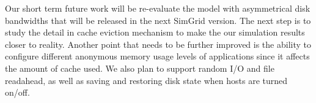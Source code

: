 \documentclass[conference]{IEEEtran}
\begin{document}
			Our short term future work will be re-evaluate the model with asymmetrical 
			disk bandwidths that will be released in the next SimGrid version.
			The next step is to study the detail in cache eviction mechanism to make 
			the our simulation results closer to reality. 
			Another point that needs to be further improved is the ability to configure  
			different anonymous memory usage levels of applications since it affects  
			the amount of cache used.
			We also plan to support random I/O and file readahead, as well as 
			saving and restoring disk state when hosts are turned on/off.	 



\end{document}
